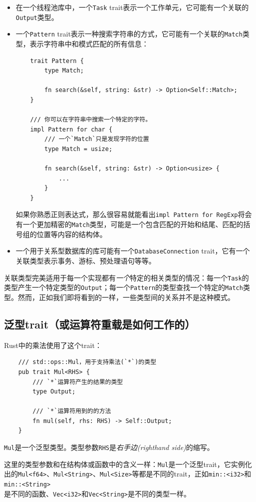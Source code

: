 \begin{itemize}
    \item 在一个线程池库中，一个\texttt{Task} trait表示一个工作单元，它可能有一个关联的\texttt{Output}类型。
    \item 一个\texttt{Pattern} trait表示一种搜索字符串的方式，它可能有一个关联的\texttt{Match}类型，表示字符串中和模式匹配的所有信息：
    \begin{verbatim}
    trait Pattern {
        type Match;

        fn search(&self, string: &str) -> Option<Self::Match>;
    }

    /// 你可以在字符串中搜索一个特定的字符。
    impl Pattern for char {
        /// 一个`Match`只是发现字符的位置
        type Match = usize;

        fn search(&self, string: &str) -> Option<usize> {
            ...
        }
    }
    \end{verbatim}

    如果你熟悉正则表达式，那么很容易就能看出\texttt{impl Pattern for RegExp}将会有一个更加精密的\texttt{Match}类型，可能是一个包含匹配的开始和结尾、匹配的括号组的位置等内容的结构体。

    \item 一个用于关系型数据库的库可能有一个\texttt{DatabaseConnection} trait，它有一个关联类型表示事务、游标、预处理语句等等。
\end{itemize}

关联类型完美适用于每一个实现都有\emph{一个}特定的相关类型的情况：每一个\texttt{Task}的类型产生一个特定类型的\texttt{Output}；每一个\texttt{Pattern}的类型查找一个特定的\texttt{Match}类型。然而，正如我们即将看到的一样，一些类型间的关系并不是这种模式。

\subsection{泛型trait（或运算符重载是如何工作的）}
Rust中的乘法使用了这个trait：
\begin{verbatim}
    /// std::ops::Mul，用于支持乘法(`*`)的类型
    pub trait Mul<RHS> {
        /// `*`运算符产生的结果的类型
        type Output;

        /// `*`运算符用到的的方法
        fn mul(self, rhs: RHS) -> Self::Output;
    }
\end{verbatim}

\texttt{Mul}是一个泛型类型。类型参数\texttt{RHS}是\emph{右手边(righthand side)}的缩写。

这里的类型参数和在结构体或函数中的含义一样：\texttt{Mul}是一个泛型trait，它实例化出的\texttt{Mul<f64>}、\texttt{Mul<String>}、\texttt{Mul<Size>}等都是不同的trait，正如\texttt{min::<i32>}和\texttt{min::<String>}\\
是不同的函数、\texttt{Vec<i32>}和\texttt{Vec<String>}是不同的类型一样。

